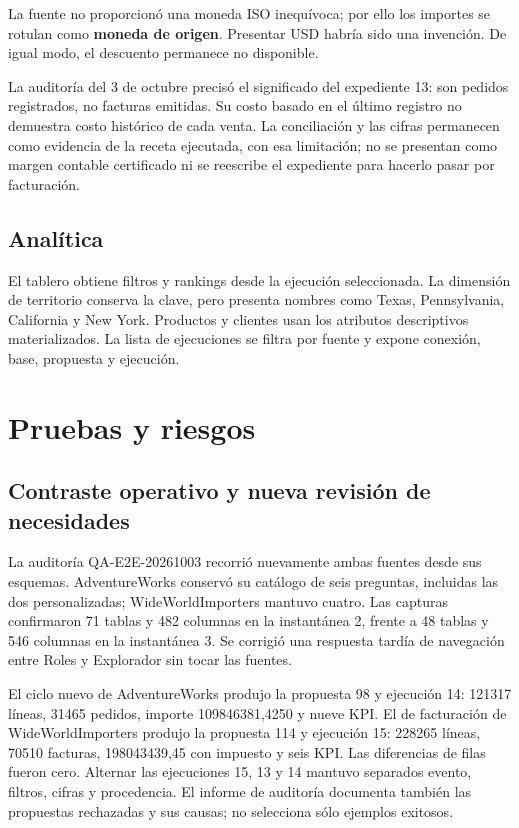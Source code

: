 \documentclass[11pt,letterpaper]{article}
\begin{document}
La fuente no proporcionó una moneda ISO inequívoca; por ello los importes se rotulan como
\textbf{moneda de origen}. Presentar USD habría sido una invención. De igual modo, el
descuento permanece no disponible.

La auditoría del 3 de octubre precisó el significado del expediente 13: son pedidos
registrados, no facturas emitidas. Su costo basado en el último registro no demuestra
costo histórico de cada venta. La conciliación y las cifras permanecen como evidencia
de la receta ejecutada, con esa limitación; no se presentan como margen contable
certificado ni se reescribe el expediente para hacerlo pasar por facturación.

\subsection{Analítica}

El tablero obtiene filtros y rankings desde la ejecución seleccionada. La dimensión de
territorio conserva la clave, pero presenta nombres como Texas, Pennsylvania, California
y New York. Productos y clientes usan los atributos descriptivos materializados. La lista
de ejecuciones se filtra por fuente y expone conexión, base, propuesta y ejecución.

\section{Pruebas y riesgos}

\subsection{Contraste operativo y nueva revisión de necesidades}

La auditoría QA-E2E-20261003 recorrió nuevamente ambas fuentes desde sus esquemas.
AdventureWorks conservó su catálogo de seis preguntas, incluidas las dos personalizadas;
WideWorldImporters mantuvo cuatro. Las capturas confirmaron 71 tablas y 482 columnas
en la instantánea 2, frente a 48 tablas y 546 columnas en la instantánea 3. Se corrigió
una respuesta tardía de navegación entre Roles y Explorador sin tocar las fuentes.

El ciclo nuevo de AdventureWorks produjo la propuesta 98 y ejecución 14: 121317 líneas,
31465 pedidos, importe 109846381,4250 y nueve KPI. El de facturación de WideWorldImporters
produjo la propuesta 114 y ejecución 15: 228265 líneas, 70510 facturas,
198043439,45 con impuesto y seis KPI. Las diferencias de filas fueron cero. Alternar
las ejecuciones 15, 13 y 14 mantuvo separados evento, filtros, cifras y procedencia.
El informe de auditoría documenta también las propuestas rechazadas y sus causas;
no selecciona sólo ejemplos exitosos.
\end{document}
